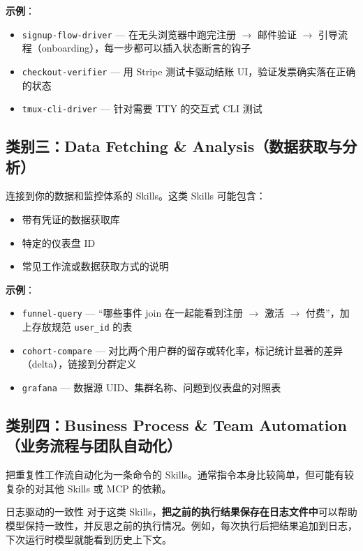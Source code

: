 \textbf{示例}：
\begin{itemize}
    \item \texttt{signup-flow-driver} --- 在无头浏览器中跑完注册 $\to$ 邮件验证 $\to$ 引导流程（onboarding），每一步都可以插入状态断言的钩子
    \item \texttt{checkout-verifier} --- 用 Stripe 测试卡驱动结账 UI，验证发票确实落在正确的状态
    \item \texttt{tmux-cli-driver} --- 针对需要 TTY 的交互式 CLI 测试
\end{itemize}

\subsection{类别三：Data Fetching \& Analysis（数据获取与分析）}

连接到你的数据和监控体系的 Skills。这类 Skills 可能包含：
\begin{itemize}
    \item 带有凭证的数据获取库
    \item 特定的仪表盘 ID
    \item 常见工作流或数据获取方式的说明
\end{itemize}

\textbf{示例}：
\begin{itemize}
    \item \texttt{funnel-query} --- ``哪些事件 join 在一起能看到注册 $\to$ 激活 $\to$ 付费''，加上存放规范 \texttt{user\_id} 的表
    \item \texttt{cohort-compare} --- 对比两个用户群的留存或转化率，标记统计显著的差异（delta），链接到分群定义
    \item \texttt{grafana} --- 数据源 UID、集群名称、问题到仪表盘的对照表
\end{itemize}

\subsection{类别四：Business Process \& Team Automation（业务流程与团队自动化）}

把重复性工作流自动化为一条命令的 Skills。通常指令本身比较简单，但可能有较复杂的对其他 Skills 或 MCP 的依赖。

\begin{knowledgebox}{日志驱动的一致性}
对于这类 Skills，\textbf{把之前的执行结果保存在日志文件中}可以帮助模型保持一致性，并反思之前的执行情况。例如，每次执行后把结果追加到日志，下次运行时模型就能看到历史上下文。
\end{knowledgebox}

